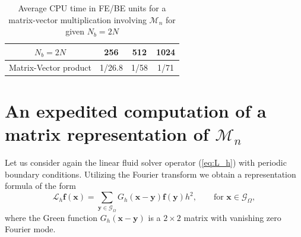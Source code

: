 \documentclass[preprint,12pt]{elsarticle}
\begin{document}
\begin{table}
\begin{center}
\begin{tabular}{|c|c c c|}
\hline
$N_b=2N$ &  256  & 512 & 1024\\
\hline
\textrm{Matrix-Vector product} 
& 1/26.8  & 1/58 &  1/71\\
\hline
\end{tabular}
\end{center}
\caption{Average CPU time in FE/BE units for a matrix-vector multiplication involving $\mathcal{M}_n$ for given $N_b=2N$}
\label{Table:MV}
\end{table}


\section{An expedited computation of a matrix representation of $\mathcal{M}_n$}
\label{Sec:matrix}
Let us consider again the linear fluid solver operator (\ref{eq:L_h}) with periodic boundary conditions. Utilizing the Fourier transform we obtain a representation formula of the form
\begin{equation}
 \mathcal{L}_h \mathbf{f}(\mathbf{x}) = \sum_{\mathbf{y} \in \mathcal{G}_\Omega} G_h (\mathbf{x}-\mathbf{y})\mathbf{f}(\mathbf{y})h^2, \qquad \text{for $\mathbf{x} \in \mathcal{G}_\Omega$},
\label{eq:G_h}
\end{equation}
where the Green function $ G_h (\mathbf{x}-\mathbf{y})$ is a $2 \times 2$ matrix with vanishing zero Fourier mode. 
\end{document}
